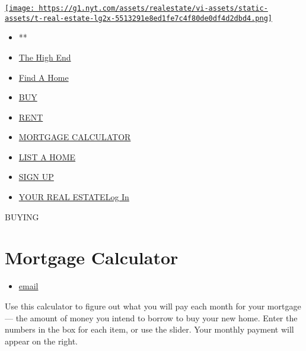\href{/section/realestate}{\texttt{[image: https://g1.nyt.com/assets/realestate/vi-assets/static-assets/t-real-estate-lg2x-5513291e8ed1fe7c4f80de0df4d2dbd4.png]}}

\begin{itemize}
\tightlist
\item
  **
\item
  \href{/real-estate/the-high-end}{The High End}
\item
  \href{/real-estate/find-a-home}{Find A Home}
\item
  \href{/real-estate/homes-for-sale}{BUY}
\item
  \href{/real-estate/homes-for-rent}{RENT}
\item
  \href{/real-estate/mortgage-calculator}{MORTGAGE CALCULATOR}
\item
  \href{https://nytimesads.gtspayments.com}{LIST A HOME}
\item
  \href{https://myaccount.nytimes.com/auth/register?client_id=real.estate.ui\&display=control\&redirect_uri=\%2Freal-estate\%2Fmortgage-calculator\%3F\&response_type=cookie}{SIGN
  UP}
\item
  \href{https://myaccount.nytimes.com/auth/login?client_id=real.estate.ui\&display=control\&redirect_uri=\%2Freal-estate\%2Fmortgage-calculator\%3F\&response_type=cookie}{YOUR
  REAL ESTATELog In}
\end{itemize}

 BUYING

\hypertarget{mortgage-calculator}{%
\section{Mortgage Calculator}\label{mortgage-calculator}}

\begin{itemize}
\tightlist
\item
  \href{mailto:?subject=NYTimes.com:\%20Mortgage\%20Calculator\%20-\%20Estimate\%20Mortgage\%20Payments\&body=From\%20The\%20New\%20York\%20Times:\%0D\%0A\%20\%0D\%0AMortgage\%20Calculator\%20-\%20Estimate\%20Mortgage\%20Payments\%0D\%0A\%20\%0D\%0ADescription\%20Here\%0D\%0A\%20\%0D\%0Ahttps://www.nytimes.com/real-estate/mortgage-calculator}{email}
\end{itemize}

Use this calculator to figure out what you will pay each month for your
mortgage --- the amount of money you intend to borrow to buy your new
home. Enter the numbers in the box for each item, or use the slider.
Your monthly payment will appear on the right.

